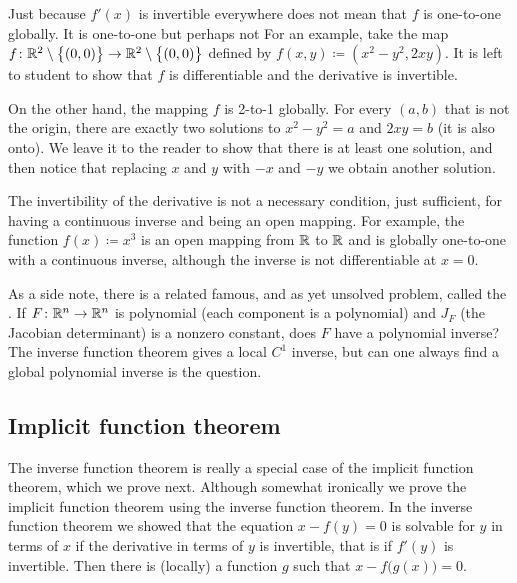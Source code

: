 \begin{example}
Just because $f'(x)$ is invertible everywhere does not
mean that $f$ is
one-to-one globally.  It is  one-to-one but perhaps not
  For an
example, take the map $f \colon {\mathbb{R}}^2 \setminus \bigl\{ (0,0) \bigr\} \to
{\mathbb{R}}^2 \setminus \bigl\{ (0,0) \bigr\}$ defined
by $f(x,y) \coloneqq (x^2-y^2,2xy)$.
It is left to student to show that $f$ is
differentiable and the derivative is invertible.

On the other hand, the mapping $f$ is 2-to-1 globally.  For every
$(a,b)$ that is not the origin, there are exactly two
solutions to $x^2-y^2=a$ and $2xy=b$ (it is also onto).  We leave it to the
reader
to show that there is at least one solution, and then notice
that replacing $x$ and $y$ with $-x$ and $-y$ we obtain another solution.
\end{example}

The invertibility of the derivative is not a necessary
condition, just sufficient, for having a continuous inverse and being an open
mapping.  For example, the function $f(x) \coloneqq x^3$ is an open mapping from ${\mathbb{R}}$
to ${\mathbb{R}}$ and is globally one-to-one with a continuous inverse, although the
inverse is not differentiable at $x=0$.

\medskip

As a side note, there is a related famous, and as yet unsolved problem,
called the \emph{}.  If $F \colon {\mathbb{R}}^n \to
{\mathbb{R}}^n$ is polynomial (each component is a polynomial) and $J_F$
(the Jacobian determinant) is a nonzero
constant, does $F$ have a polynomial inverse?
The inverse function theorem gives a local $C^1$ inverse, but can one always
find a global polynomial inverse is the question.

\subsection{Implicit function theorem}

The inverse function theorem is really a special case of the implicit
function theorem, which we prove next.  Although somewhat ironically we 
prove the implicit function theorem using the inverse function theorem.
In the inverse function theorem we showed that
the equation $x-f(y) = 0$ is solvable for $y$ in terms of $x$ if the derivative
in terms of $y$ is invertible, that is if $f'(y)$ is invertible.
Then there is (locally) a
function $g$ such that $x-f\bigl(g(x)\bigr) = 0$.

